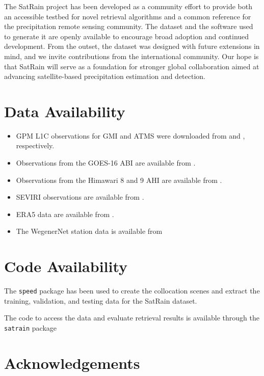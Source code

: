 \documentclass[11pt]{article}
\providecommand{\DIFaddend}{} %
\begin{document}
\DIFaddend The SatRain project has been developed as a community effort to provide both an
accessible testbed for novel retrieval algorithms and a common reference for the
precipitation remote sensing community. The dataset and the software used to
generate it are openly available to encourage broad adoption and continued
development. From the outset, the dataset was designed with future extensions in
mind, and we invite contributions from the international community. Our hope is
that SatRain will serve as a foundation for stronger global collaboration aimed
at advancing satellite-based precipitation estimation and detection.

\section*{Data Availability}

\begin{itemize}
\item GPM L1C observations for GMI and ATMS were downloaded from \cite{Berg2022_GMI_L1C_R_V07} and \cite{Berg2022_ATMS_NOAA20_1C_V07}, respectively.
\item Observations from the GOES-16 ABI are available from \cite{NOAA_GOES_AWS}.
\item Observations from the Himawari 8 and 9 AHI are available from \cite{NOAA_HIMAWARI_AWS}.
\item SEVIRI observations are available from \cite{EUMETSAT_SEVIRI}.
\item ERA5 data are available from \cite{CDS_ERA5}.
\item The WegenerNet station data is available from \cite{WegenerNet2025}
\end{itemize}

\section*{Code Availability}

The \texttt{speed} package \citep{Speed2025} has been used to create the
collocation scenes and extract the training, validation, and testing data for
the SatRain dataset.

The code to access the data and evaluate retrieval results is available through
the \texttt{satrain} package \citep{SatRain2025}

\section*{Acknowledgements}
\end{document}
